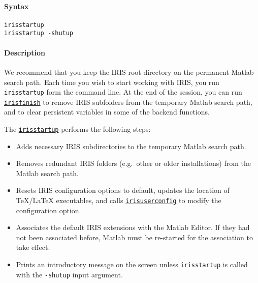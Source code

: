 


	\paragraph{Syntax}\label{syntax}

\begin{verbatim}
irisstartup
irisstartup -shutup
\end{verbatim}

\paragraph{Description}\label{description}

We recommend that you keep the IRIS root directory on the permanent
Matlab search path. Each time you wish to start working with IRIS, you
run \texttt{irisstartup} form the command line. At the end of the
session, you can run \href{config/irisfinish}{\texttt{irisfinish}} to
remove IRIS subfolders from the temporary Matlab search path, and to
clear persistent variables in some of the backend functions.

The \href{config/irisstartup}{\texttt{irisstartup}} performs the
following steps:

\begin{itemize}
\item
  Adds necessary IRIS subdirectories to the temporary Matlab search
  path.
\item
  Removes redundant IRIS folders (e.g.~other or older installations)
  from the Matlab search path.
\item
  Resets IRIS configuration options to default, updates the location of
  TeX/LaTeX executables, and calls
  \href{config/irisuserconfighelp}{\texttt{irisuserconfig}} to modify
  the configuration option.
\item
  Associates the default IRIS extensions with the Matlab Editor. If they
  had not been associated before, Matlab must be re-started for the
  association to take effect.
\item
  Prints an introductory message on the screen unless
  \texttt{irisstartup} is called with the \texttt{-shutup} input
  argument.
\end{itemize}


